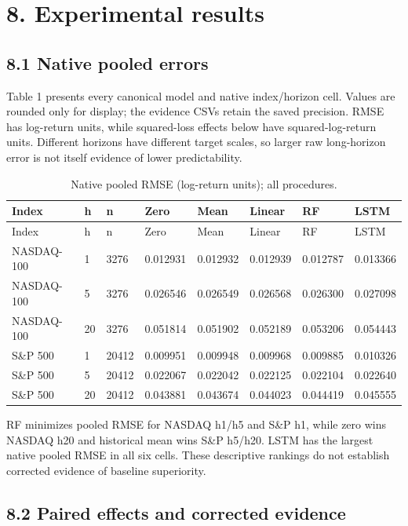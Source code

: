 \documentclass[11pt]{article}
\begin{document}
\section*{8. Experimental results}

\subsection*{8.1 Native pooled errors}

Table 1 presents every canonical model and native index/horizon cell. Values are rounded only for display; the evidence CSVs retain the saved precision. RMSE has log-return units, while squared-loss effects below have squared-log-return units. Different horizons have different target scales, so larger raw long-horizon error is not itself evidence of lower predictability.


\Needspace{119pt}
{\footnotesize
\begin{longtable}{llllllll}
\caption{Native pooled RMSE (log-return units); all procedures.}\\
\toprule
Index & h & n & Zero & Mean & Linear & RF & LSTM\\
\midrule\endfirsthead
\toprule
Index & h & n & Zero & Mean & Linear & RF & LSTM\\
\midrule\endhead
NASDAQ-100 & 1 & 3276 & 0.012931 & 0.012932 & 0.012939 & 0.012787 & 0.013366\\
NASDAQ-100 & 5 & 3276 & 0.026546 & 0.026549 & 0.026568 & 0.026300 & 0.027098\\
NASDAQ-100 & 20 & 3276 & 0.051814 & 0.051902 & 0.052189 & 0.053206 & 0.054443\\
S\&P 500 & 1 & 20412 & 0.009951 & 0.009948 & 0.009968 & 0.009885 & 0.010326\\
S\&P 500 & 5 & 20412 & 0.022067 & 0.022042 & 0.022125 & 0.022104 & 0.022640\\
S\&P 500 & 20 & 20412 & 0.043881 & 0.043674 & 0.044023 & 0.044419 & 0.045555\\
\bottomrule\end{longtable}}

RF minimizes pooled RMSE for NASDAQ h1/h5 and S\&P h1, while zero wins NASDAQ h20 and historical mean wins S\&P h5/h20. LSTM has the largest native pooled RMSE in all six cells. These descriptive rankings do not establish corrected evidence of baseline superiority.

\subsection*{8.2 Paired effects and corrected evidence}
\end{document}
